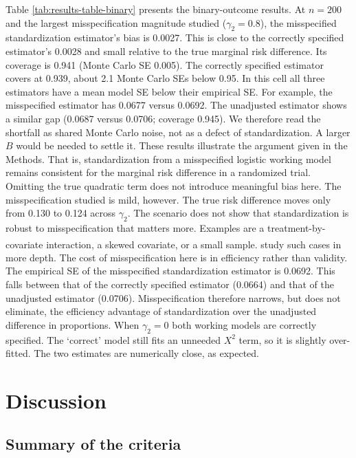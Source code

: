\documentclass[
  11pt,
]{article}
\begin{document}
Table \ref{tab:results-table-binary} presents the
binary-outcome results. At \(n = 200\) and the largest
misspecification magnitude studied (\(\gamma_2 = 0.8\)),
the misspecified standardization estimator's bias is
0.0027. This is close to
the correctly specified estimator's
0.0028 and small
relative to the true marginal risk difference. Its
coverage is 0.941 (Monte
Carlo SE 0.005). The
correctly specified estimator covers at
0.939, about
2.1 Monte Carlo SEs below 0.95. In this cell all three
estimators have a mean model SE below their empirical
SE. For example, the misspecified estimator has
0.0677 versus
0.0692. The unadjusted
estimator shows a similar gap
(0.0687 versus
0.0706; coverage
0.945). We therefore
read the shortfall as shared Monte Carlo noise, not as
a defect of standardization. A larger \(B\) would be
needed to settle it. These results illustrate the
argument given in the Methods. That is, standardization
from a misspecified logistic working model remains
consistent for the marginal risk difference in a
randomized trial. Omitting the true quadratic term does
not introduce meaningful bias here. The
misspecification studied is mild, however. The true
risk difference moves only from
0.130 to
0.124 across \(\gamma_2\). The
scenario does not show that standardization is robust
to misspecification that matters more. Examples are a
treatment-by-covariate interaction, a skewed covariate,
or a small sample.\textsuperscript{} study
such cases in more depth. The cost of misspecification
here is in efficiency rather than validity. The empirical SE
of the misspecified standardization estimator is
0.0692. This falls
between that of the correctly specified estimator
(0.0664) and that of
the unadjusted estimator
(0.0706). Misspecification
therefore narrows, but does not eliminate, the efficiency
advantage of standardization over the unadjusted
difference in proportions. When \(\gamma_2 = 0\) both
working models are correctly specified. The `correct'
model still fits an unneeded \(X^2\) term, so it is
slightly over-fitted. The two estimates are numerically
close, as expected.

\section{Discussion}\label{discussion}

\subsection{Summary of the criteria}\label{summary-of-the-criteria}
\end{document}
